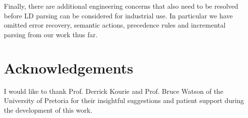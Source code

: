 \documentclass[a4paper,11pt]{article}
\begin{document}
Finally, there are additional engineering concerns that also need to be resolved before LD parsing can be considered for industrial use.
In particular we have omitted error recovery, semantic actions, precedence rules and incremental parsing from our work thus far.


\section*{Acknowledgements}
I would like to thank Prof. Derrick Kourie and Prof. Bruce Watson of the University of Pretoria for their insightful suggestions and patient support during the development of this work.



\end{document}
